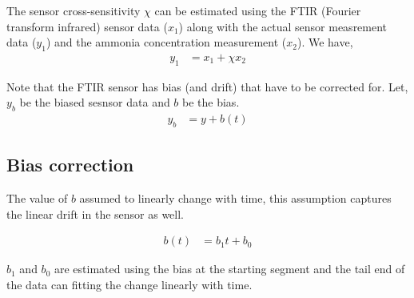 
The sensor cross-sensitivity $\chi$ can be estimated using the FTIR (Fourier
transform infrared) sensor data ($x_1$) along with the actual sensor measrement
data ($y_1$) and the ammonia concentration measurement ($x_2$). We have,
\begin{align*}
    y_1 &= x_1 + \chi x_2
\end{align*}

Note that the FTIR sensor has bias (and drift) that have to be corrected for.
Let, $y_b$ be the biased sesnsor data and $b$ be the bias.
\begin{align*}
    y_b &= y + b(t)
\end{align*}

\subsection{Bias correction}
The value of $b$ assumed to linearly change with time, this assumption captures
the linear drift in the sensor as well.

\begin{align*}
    b(t) &= b_1 t + b_0
\end{align*}

$b_1$ and $b_0$ are estimated using the bias at the starting segment and the
tail end of the data can fitting the change linearly with time.

